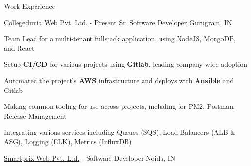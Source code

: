 \documentclass[UKenglish]{resume} %
\begin{document}
\begin{rSection}{Work Experience}

    \begin{rSubsection}
        {\href{https://collegedunia.com}{Collegedunia Web Pvt. Ltd.}}
        {  - Present }
        {Sr. Software Developer}
        {Gurugram, IN}

        \item Team Lead for a multi-tenant fullstack application, using NodeJS, MongoDB, and React
        \item Setup \textbf{CI/CD} for various projects using \textbf{Gitlab}, leading company wide adoption
        \item Automated the project's \textbf{AWS} infrastructure and deploys with \textbf{Ansible} and Gitlab
        \item Making common tooling for use across projects, including for PM2, Postman, Release Management
        \item Integrating various services including Queues (SQS), Load Balancers (ALB \& ASG), Logging (ELK), Metrics (InfluxDB)

    \end{rSubsection}

    \begin{rSubsection}
        {\href{https://www.smartprix.com}{Smartprix Web Pvt. Ltd.}}
        {  -  }
        {Software Developer}
        {Noida, IN}


\end{rSubsection}
\end{rSection}
\end{document}
